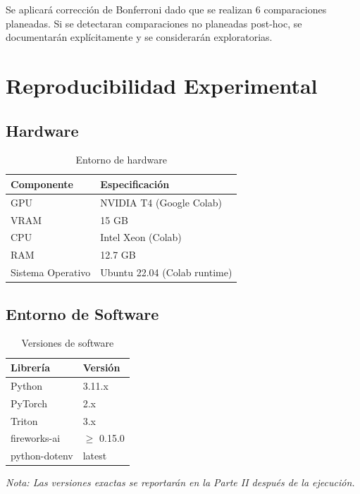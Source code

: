 \documentclass[12pt]{article}
\begin{document}
Se aplicará corrección de Bonferroni dado que se realizan 6 comparaciones planeadas.
Si se detectaran comparaciones no planeadas post-hoc, se documentarán explícitamente
y se considerarán exploratorias.

\section{Reproducibilidad Experimental}

\subsection{Hardware}

\begin{table}[H]
\centering
\caption{Entorno de hardware}
\begin{tabular}{ll}
\toprule
\textbf{Componente} & \textbf{Especificación} \\
\midrule
GPU & NVIDIA T4 (Google Colab) \\
VRAM & 15 GB \\
CPU & Intel Xeon (Colab) \\
RAM & 12.7 GB \\
Sistema Operativo & Ubuntu 22.04 (Colab runtime) \\
\bottomrule
\end{tabular}
\end{table}

\subsection{Entorno de Software}

\begin{table}[H]
\centering
\caption{Versiones de software}
\begin{tabular}{ll}
\toprule
\textbf{Librería} & \textbf{Versión} \\
\midrule
Python & 3.11.x \\
PyTorch & 2.x \\
Triton & 3.x \\
fireworks-ai & $\geq$ 0.15.0 \\
python-dotenv & latest \\
\bottomrule
\end{tabular}
\end{table}

\textit{Nota: Las versiones exactas se reportarán en la Parte II después de la ejecución.}
\end{document}

